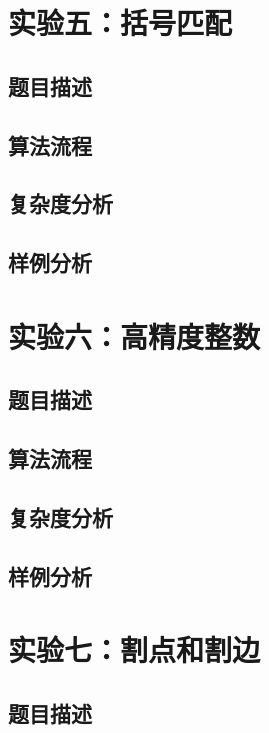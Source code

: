 \documentclass[UTF8,a4paperdui, %
]{ctexart}
\begin{document}
\newpage
\section{实验五：括号匹配}

\subsection{题目描述}

\subsection{算法流程}

\subsection{复杂度分析}

\subsection{样例分析}

\newpage
\section{实验六：高精度整数}

\subsection{题目描述}

\subsection{算法流程}

\subsection{复杂度分析}

\subsection{样例分析}

\newpage
\section{实验七：割点和割边}

\subsection{题目描述}
\end{document}
